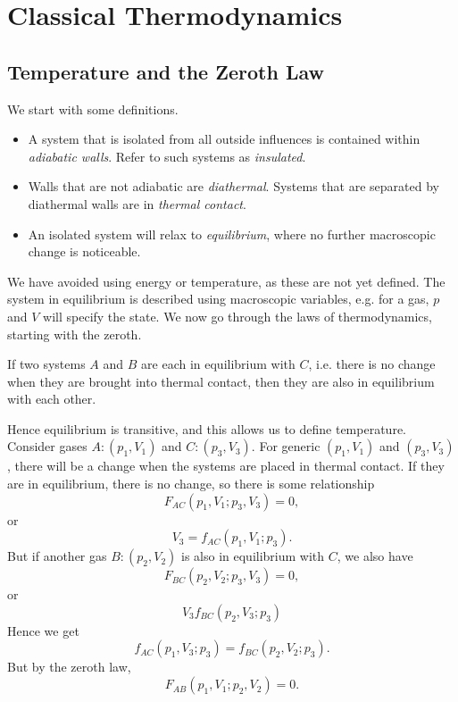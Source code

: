 \documentclass[12pt]{article}
\begin{document}
\newpage

\section{Classical Thermodynamics}
\label{sec:therm}

\subsection{Temperature and the Zeroth Law}
\label{sub:t_0}

We start with some definitions.
\begin{itemize}
	\item A system that is isolated from all outside influences is contained within \emph{adiabatic walls}. Refer to such systems as \emph{insulated}.
	\item Walls that are not adiabatic are \emph{diathermal}. Systems that are separated by diathermal walls are in \emph{thermal contact}.
	\item An isolated system will relax to \emph{equilibrium}, where no further macroscopic change is noticeable.
\end{itemize}

We have avoided using energy or temperature, as these are not yet defined. The system in equilibrium is described using macroscopic variables, e.g. for a gas, $p$ and $V$ will specify the state. We now go through the laws of thermodynamics, starting with the zeroth.

\begin{center}
	If two systems $A$ and $B$ are each in equilibrium with $C$, i.e. there is no change when they are brought into thermal contact, then they are also in equilibrium with each other.
\end{center}

Hence equilibrium is transitive, and this allows us to define temperature. Consider gases $A : (p_1, V_1)$ and $C : (p_3, V_3)$. For generic $(p_1, V_1)$ and $(p_3, V_3)$, there will be a change when the systems are placed in thermal contact. If they are in equilibrium, there is no change, so there is some relationship
\[
F_{AC}(p_1, V_1; p_3, V_3) = 0,
\]
or
\[
V_3 = f_{AC}(p_1, V_1; p_3).
\]
But if another gas $B : (p_2, V_2)$ is also in equilibrium with $C$, we also have
\[
F_{BC} (p_2, V_2; p_3, V_3) = 0,
\]
or
\[
V_3 f_{BC}(p_2, V_3; p_3)
\]
Hence we get
\[
f_{AC}(p_1, V_3; p_3) = f_{BC}(p_2, V_2; p_3).
\]
But by the zeroth law,
\[
F_{AB}(p_1, V_1; p_2, V_2) = 0.
\]
\end{document}
